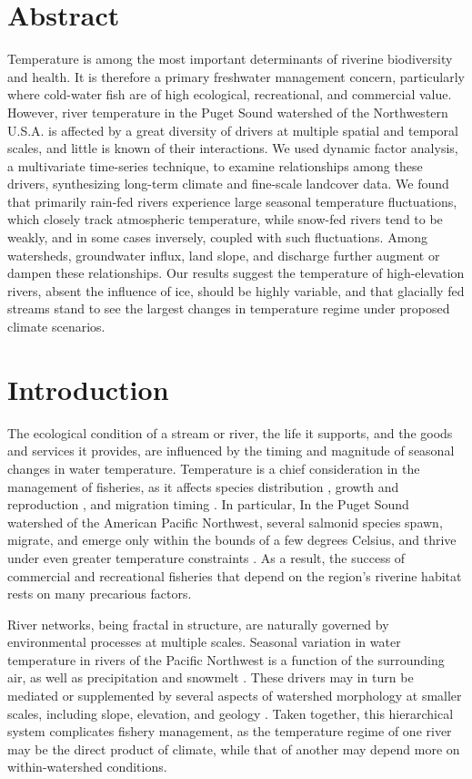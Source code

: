 \documentclass[notitlepage]{article}
\begin{document}
\section*{Abstract}
Temperature is among the most important determinants of riverine biodiversity and health. It is therefore a primary freshwater management concern, particularly where cold-water fish are of high ecological, recreational, and commercial value. However, river temperature in the Puget Sound watershed of the Northwestern U.S.A. is affected by a great diversity of drivers at multiple spatial and temporal scales, and little is known of their interactions. We used dynamic factor analysis, a multivariate time-series technique, to examine relationships among these drivers, synthesizing long-term climate and fine-scale landcover data. We found that primarily rain-fed rivers experience large seasonal temperature fluctuations, which closely track atmospheric temperature, while snow-fed rivers tend to be weakly, and in some cases inversely, coupled with such fluctuations. Among watersheds, groundwater influx, land slope, and discharge further augment or dampen these relationships. Our results suggest the temperature of high-elevation rivers, absent the influence of ice, should be highly variable, and that glacially fed streams stand to see the largest changes in temperature regime under proposed climate scenarios.
\clearpage

\section*{Introduction}

The ecological condition of a stream or river, the life it supports, and the goods and services it provides, are influenced by the timing and magnitude of seasonal changes in water temperature. Temperature is a chief consideration in the management of fisheries, as it affects species distribution \citep{Boisneau2008}, growth and reproduction \citep{mccullough1999review}, and migration timing \citep{boscarino2007effects}. In particular, In the Puget Sound watershed of the American Pacific Northwest, several salmonid species spawn, migrate, and emerge only within the bounds of a few degrees Celsius, and thrive under even greater temperature constraints \citep{carter2005effects}. As a result, the success of commercial and recreational fisheries that depend on the region's riverine habitat rests on many precarious factors.

River networks, being fractal in structure, are naturally governed by environmental processes at multiple scales. Seasonal variation in water temperature in rivers of the Pacific Northwest is a function of the surrounding air, as well as precipitation and snowmelt \citep{eldridge1967water}. These drivers may in turn be mediated or supplemented by several aspects of watershed morphology at smaller scales, including slope, elevation, and geology \citep{poole2001ecological,lisi2013association}. Taken together, this hierarchical system complicates fishery management, as the temperature regime of one river may be the direct product of climate, while that of another may depend more on within-watershed conditions.
\end{document}
